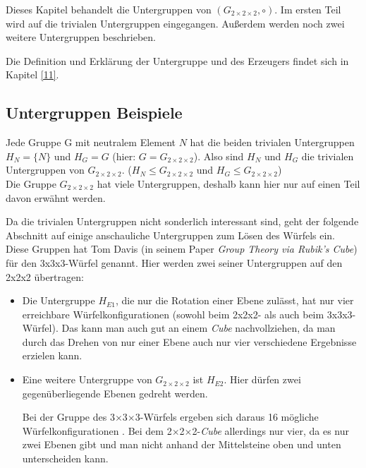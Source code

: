 \documentclass[12pt,a4paper, usenames, dvipsnames]{article}
\newcommand{\Gtwo}{\ensuremath{G_{2\times 2\times 2}}}
\newcommand{\Ttwo}{2$\times$2$\times$2-}
\newcommand{\Tthree}{3$\times$3$\times$3-}
\begin{document}
Dieses Kapitel behandelt die Untergruppen von $(\Gtwo, \circ)$. Im ersten Teil wird auf die trivialen Untergruppen eingegangen. Außerdem werden noch zwei weitere Untergruppen beschrieben.

Die Definition und Erklärung der Untergruppe und des Erzeugers findet sich in Kapitel \ref{11}.

%
%
%
%
%
%
%
%
%
%
%
%
%
%
%
%
%
%
%
%
\subsection*{Untergruppen Beispiele}



Jede Gruppe G mit neutralem Element $N$ hat die beiden trivialen Untergruppen ${H_N = \{N\}}$ und $H_G=G$ (hier: $G=\Gtwo$). Also sind $H_N$ und $H_G$ die trivialen Untergruppen von $\Gtwo$. ($H_N \leqslant \Gtwo$ und $H_G \leqslant \Gtwo$)\\
Die Gruppe $\Gtwo$ hat viele Untergruppen, deshalb kann hier nur auf einen Teil davon erwähnt werden. 


Da die trivialen Untergruppen nicht sonderlich interessant sind, geht der folgende Abschnitt auf einige anschauliche Untergruppen zum Lösen des Würfels ein. Diese Gruppen hat Tom Davis (in seinem Paper \textit{Group Theory via Rubik's Cube}) \cite{TD} für den 3x3x3-Würfel genannt. Hier werden zwei seiner Untergruppen auf den 2x2x2 übertragen: 
\begin{itemize}
\item Die Untergruppe $H_{E1}$, die nur die Rotation einer Ebene zulässt, hat nur vier erreichbare Würfelkonfigurationen (sowohl beim 2x2x2- als auch beim 3x3x3-Würfel). Das kann man auch gut an einem \textit{Cube} nachvollziehen, da man durch das Drehen von nur einer Ebene auch nur vier verschiedene Ergebnisse erzielen kann.
\item Eine weitere Untergruppe von $\Gtwo$ ist $H_{E2}$. Hier dürfen zwei gegenüberliegende Ebenen gedreht werden. 

Bei der Gruppe des \Tthree Würfels ergeben sich daraus 16 mögliche Würfelkonfigurationen \cite{TD}. Bei dem \Ttwo \textit{Cube} allerdings nur vier, da es nur zwei Ebenen gibt und man nicht anhand der Mittelsteine oben und unten unterscheiden kann.
\end{itemize}
\end{document}
